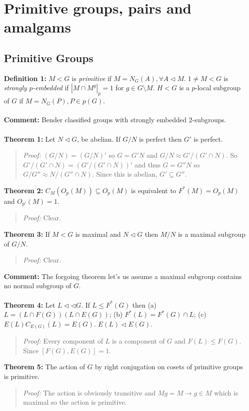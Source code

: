 \chapter{Primitive groups, pairs and amalgams}
\section {Primitive Groups}
{\bf Definition 1:} $M<G$ is \emph{primitive} if $M=N_G(A), \forall A \lhd M$. $1 \ne M <G$ is
\emph{strongly $p$-embedded} if $|M \cap M^g|_p = 1$ for $g \in G \setminus M$.
$H<G$ is a $p$-local subgroup of $G$ if $M= N_G(P), P \in p(G)$.
\\
\\
{\bf Comment:} Bender classified groups with strongly embedded $2$-subgroups.
\\
\\
{\bf Theorem 1:}
Let $N \lhd G$, be abelian.  If $G/N$ is perfect then $G'$ is perfect.
\begin{quote}
\emph{Proof:}
$(G/N)= (G/N)'$ so $G= G'N$ and
$G/N \approx G'/(G' \cap N)$.  So
$G'/(G' \cap N)=
(G'/(G' \cap N))'$ and thus $G=G''N$ so $G/G'' \approx N/(G'' \cap N)$.  Since this is abelian,
$G' \subseteq G''$.
\end{quote}
{\bf Theorem 2:}
$C_M(O_p(M)) \subseteq O_p(M)$ is equivalent to $F^*(M)=O_p(M)$ and $O_{p'}(M)=1$.
\begin{quote}
\emph{Proof:}
Clear.
\end{quote}
{\bf Theorem 3:}
If $M<G$ is maximal and $N \lhd G$ then $M/N$ is a maximal subgroup of $G/N$.
\begin{quote}
\emph{Proof:}  Clear.
\end{quote}
{\bf Comment:} The forgoing theorem let's us assume a maximal subgroup contains no normal subgroup of
$G$.
\\
\\
{\bf Theorem 4:}  Let $L \lhd \lhd G$.  If $L \leq F^*(G)$ then (a)
$L= (L \cap F(G))(L \cap E(G))$; (b) $F^*(L) = F^*(G) \cap L$; (c)
$E(L) C_{E(G)}(L) = E(G)$.  $E(L) \lhd E(G)$.
\begin{quote}
\emph{Proof:}
Every component of $L$ is a component of $G$ and $F(L) \leq F(G)$.  Since $[F(G), E(G)]=1$.
\end{quote}
{\bf Theorem 5:}  The action of $G$ by right conjugation on cosets of primitive groups is primitive.
\begin{quote}
\emph{Proof:}  The action is obviously transitive and
$Mg=M \rightarrow g \in M$ which is maximal so the action is primitive.
\end{quote}
